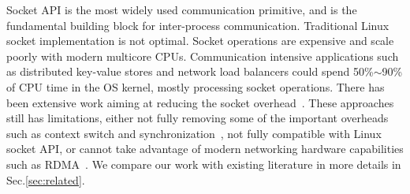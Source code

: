 Socket API is the most widely used communication primitive, and is the fundamental building block for inter-process communication. Traditional Linux socket implementation is not optimal. Socket operations are expensive and scale poorly with modern multicore CPUs. Communication intensive applications such as distributed key-value stores and network load balancers could spend 50\%$\sim$90\% of CPU time in the OS kernel, mostly processing socket operations. There has been extensive work aiming at reducing the socket overhead~\cite{peter2016arrakis,yasukata2016stackmap,nishtala2013scaling}. These approaches still has limitations, either not fully removing some of the important overheads such as context switch and synchronization~\cite{lin2016scalable,han2012megapipe,jeong2014mtcp,baumann2009multikernel}, not fully compatible with Linux socket API, or cannot take advantage of modern networking hardware capabilities such as RDMA~\cite{dunkels2001design,jeong2014mtcp,libvma,openonload}. We compare our work with existing literature in more details in Sec.\ref{sec:related}.


